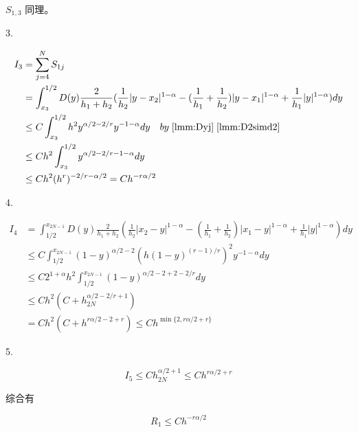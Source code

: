 \documentclass{ctexart}
\theoremstyle{definition}
\theoremstyle{remark}
\numberwithin{equation}{section}
\begin{document}
\(S_{1,3}\) 同理。

3.

\begin{equation}
    \begin{aligned}
        I_3 &= \sum_{j=4}^{N} S_{1j}                   \\
        & = \int_{x_3}^{1/2}D(y) \frac{2}{h_1 + h_{2}}
        ( \frac{1}{h_{2}} |y-x_{2}|^{1-\alpha}
        - (\frac{1}{h_{1}}+\frac{1}{h_{2}}) |y-x_{1}|^{1-\alpha}
        +  \frac{1}{h_{1}}|y|^{1-\alpha} )  dy                                         \\
            & \le C \int_{x_3}^{1/2} h^2 y^{\alpha/2-2/r} y^{-1-\alpha} dy \quad by \; \ref{lmm:Dyj} \; \ref{lmm:D2simd2}\\
            & \le C h^2 \int_{x_3}^{1/2} y^{\alpha/2 - 2/r -1 - \alpha} dy             \\
            & \le C h^2 (h^r)^{-2/r-\alpha/2} = C h^{-r\alpha/2}
    \end{aligned}
\end{equation}


4.

\begin{equation}
    \begin{aligned}
        I_4 & = \int_{1/2}^{x_{2N-1}}D(y) \frac{2}{h_1 + h_{2}}
        ( \frac{1}{h_{2}} |x_{2}-y|^{1-\alpha}
        - (\frac{1}{h_{1}}+\frac{1}{h_{2}}) |x_{1}-y|^{1-\alpha}
        +  \frac{1}{h_{1}}|y|^{1-\alpha} )  dy                                                      \\
            & \le C \int_{1/2}^{x_{2N-1}} (1-y)^{\alpha/2-2} (h (1-y)^{(r-1)/r})^2 y^{-1-\alpha} dy \\
            & \le C 2^{1+\alpha} h^2 \int_{1/2}^{x_{2N-1}} (1-y)^{\alpha/2-2 + 2 - 2/r} dy                         \\
            & \le C h^2 (C + h_{2N}^{\alpha/2-2/r+1})                                               \\
            & = C h^2 (C + h^{r\alpha/2-2+r}) \le C h^{\min\{2, r\alpha/2+r\}}
    \end{aligned}
\end{equation}

5.

\begin{equation}
    I_5 \le C h_{2N}^{\alpha/2+1} \le C h^{r\alpha/2+r}
\end{equation}

综合有

\begin{equation}
    R_1 \le C h^{-r\alpha/2}
\end{equation}
\end{document}
